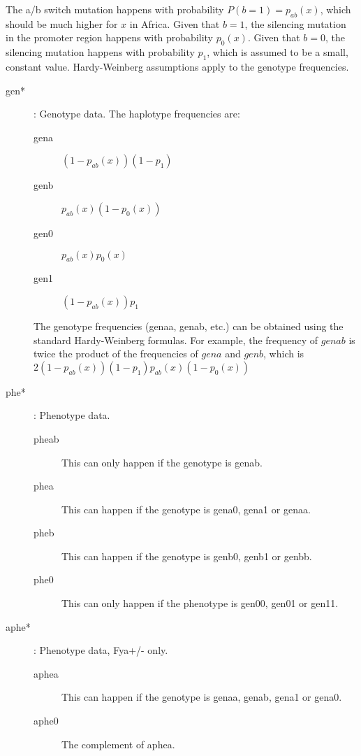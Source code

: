 \documentclass[a4paper]{article}
\begin{document}
The a/b switch mutation happens with probability $P(b=1)=p_{ab}(x)$, which should be much higher for $x$ in Africa. Given that $b=1$, the silencing mutation in the promoter region happens with probability $p_0(x)$. Given that $b=0$, the silencing mutation happens with probability $p_1$, which is assumed to be a small, constant value. Hardy-Weinberg assumptions apply to the genotype frequencies.
\begin{description}
    \item[gen*]: Genotype data. The haplotype frequencies are:
    \begin{description}
        \item[gena] $(1-p_{ab}(x))(1-p_1)$
        \item[genb] $p_{ab}(x)(1-p_0(x))$ 
        \item[gen0] $p_{ab}(x)p_0(x)$
        \item[gen1] $(1-p_{ab}(x))p_1$
    \end{description}
    The genotype frequencies (genaa, genab, etc.) can be obtained using the standard Hardy-Weinberg formulas. For example, the frequency of $genab$ is twice the product of the frequencies of $gena$ and $genb$, which is $2(1-p_{ab}(x))(1-p_1)p_{ab}(x)(1-p_0(x))$
    \item[phe*]: Phenotype data.
    \begin{description}
        \item[pheab] This can only happen if the genotype is genab.
        \item[phea] This can happen if the genotype is gena0, gena1 or genaa.
        \item[pheb] This can happen if the genotype is genb0, genb1 or genbb.
        \item[phe0] This can only happen if the phenotype is gen00, gen01 or gen11.
    \end{description}
    \item[aphe*]: Phenotype data, Fya+/- only.
    \begin{description}
        \item[aphea] This can happen if the genotype is genaa, genab, gena1 or gena0.
        \item[aphe0] The complement of aphea.

\end{description}
\end{description}
\end{document}
